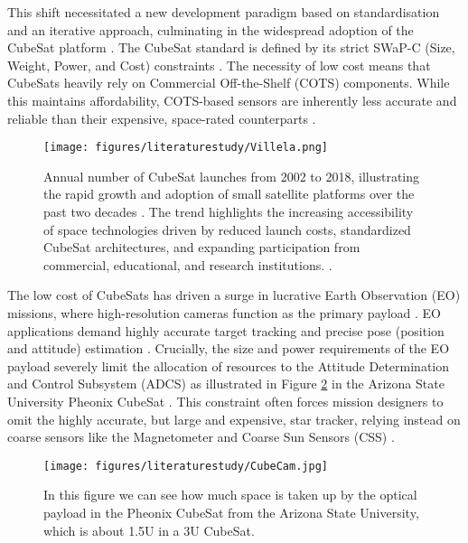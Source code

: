 \noindent
This shift necessitated a new development paradigm based on standardisation and an iterative approach, culminating in the widespread adoption of 
the CubeSat platform \cite{Mahmoud, Villela}. The CubeSat standard is defined by its strict SWaP-C (Size, Weight, Power, and Cost) 
constraints \cite{Bomani, Bouzoukis}. The necessity of low cost means that CubeSats heavily rely on Commercial Off-the-Shelf (COTS) components. 
While this maintains affordability, COTS-based sensors are inherently less accurate and reliable than their expensive, space-rated counterparts \cite{Selva}.

\begin{figure}[H]
    \centering
    \texttt{[image: figures/literaturestudy/Villela.png]}
    \caption{Annual number of CubeSat launches from 2002 to 2018, illustrating the rapid growth and adoption of small satellite platforms over the past two decades \cite{Villela}. The trend highlights the increasing accessibility of space technologies driven by reduced launch costs, standardized CubeSat architectures, and expanding participation from commercial, educational, and research institutions. \cite{Villela}.}
    \label{fig:cubesat_growth}
\end{figure}

\noindent
The low cost of CubeSats has driven a surge in lucrative Earth Observation (EO) missions, where high-resolution cameras 
function as the primary payload \cite{Azami, Nagel}. EO applications demand highly accurate target tracking and 
precise pose (position and attitude) estimation \cite{Azami}. Crucially, the size and power requirements of the EO payload severely 
limit the allocation of resources to the Attitude Determination and Control Subsystem (ADCS) \cite{Selva} as illustrated in Figure \ref{fig:adcs_limitation} in the Arizona State University Pheonix CubeSat \cite{CubeCam}. This constraint often forces mission designers to omit the highly accurate, but large and expensive, star tracker, relying instead on coarse sensors like the Magnetometer and Coarse Sun Sensors (CSS) \cite{Bomani,Toth2016}.

\begin{figure}[H]
    \centering
    \texttt{[image: figures/literaturestudy/CubeCam.jpg]}
    \caption{In this figure we can see how much space is taken up by the optical payload in the Pheonix CubeSat from the Arizona State University, which is about 1.5U in a 3U CubeSat.  \cite{CubeCam}}
    \label{fig:adcs_limitation}
\end{figure}

